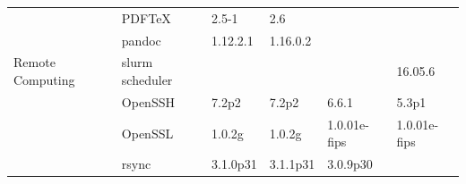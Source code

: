 \begin{table}[!ht]
{\begin{tabular}{|ll|l|l|l|l|}
\rowcolor{black!5}
\cellcolor{white}                                                      & \multicolumn{1}{|l|}{PDF\TeX}                & 2.5-1                                                               & 2.6                                                               &                                                                        &                                                \\
\rowcolor{black!10}
\cellcolor{white}                                                      & \multicolumn{1}{|l|}{pandoc}                 & 1.12.2.1                                                            & 1.16.0.2                                                          &                                                                        &                                                \\
\hline
\rowcolor{black!5}
\cellcolor{white} Remote Computing                                     & \multicolumn{1}{|l|}{slurm scheduler}        &                                                                     &                                                                   &                                                                        & 16.05.6                                        \\
\rowcolor{black!10}
\cellcolor{white}                                                      & \multicolumn{1}{|l|}{OpenSSH}                & 7.2p2                                                               & 7.2p2                                                             & 6.6.1                                                                  & 5.3p1                                          \\
\rowcolor{black!5}
\cellcolor{white}                                                      & \multicolumn{1}{|l|}{OpenSSL}                & 1.0.2g                                                              & 1.0.2g                                                            & 1.0.01e-fips                                                           & 1.0.01e-fips                                   \\
\rowcolor{black!10}
\cellcolor{white}                                                      & \multicolumn{1}{|l|}{rsync}                  & 3.1.0p31                                                            & 3.1.1p31                                                          & 3.0.9p30                                                               &                                                \\

\end{tabular}}
\end{table}
